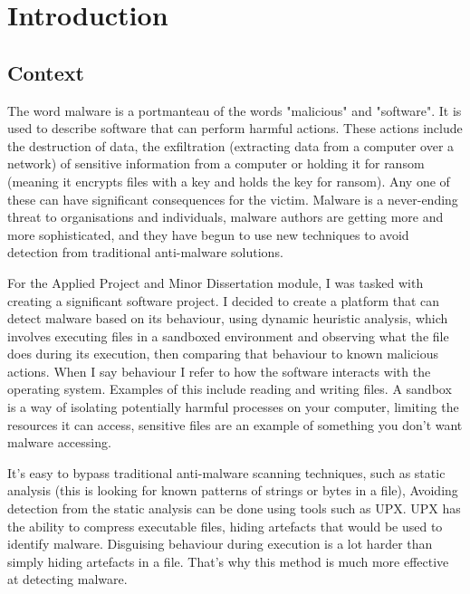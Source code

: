 \chapter{Introduction}

\section{Context}
The word malware is a portmanteau of the words "malicious" and "software".
It is used to describe software that can perform harmful actions.
These actions include the destruction of data,
the exfiltration (extracting data from a computer over a network)
of sensitive information from a computer or
holding it for ransom (meaning it encrypts files with a key and holds the key for ransom).
Any one of these can have significant consequences for the victim.
Malware is a never-ending threat to organisations and individuals,
malware authors are getting more and more sophisticated,
and they have begun to use new techniques to avoid detection
from traditional anti-malware solutions.

For the Applied Project and Minor Dissertation module,
I was tasked with creating a significant software project.
I decided to create a platform that can detect malware based on its behaviour,
using dynamic heuristic analysis, which involves executing files
in a sandboxed environment and observing what the file does during its execution,
then comparing that behaviour to known malicious actions.
When I say behaviour I refer to how the
software interacts with the operating system.
Examples of this include reading and writing files.
A sandbox is a way of isolating potentially harmful processes on your computer,
limiting the resources it can access,
sensitive files are an example of something you don't want malware accessing.

It's easy to bypass traditional anti-malware scanning techniques,
such as static analysis (this is looking for known patterns of strings or bytes in a file),
Avoiding detection from the static analysis can be done using tools such as UPX.
UPX has the ability to compress executable files, \cite{upx}
hiding artefacts that would be used to identify malware.
Disguising behaviour during execution is a lot harder
than simply hiding artefacts in a file.
That's why this method is much more effective at detecting malware.

